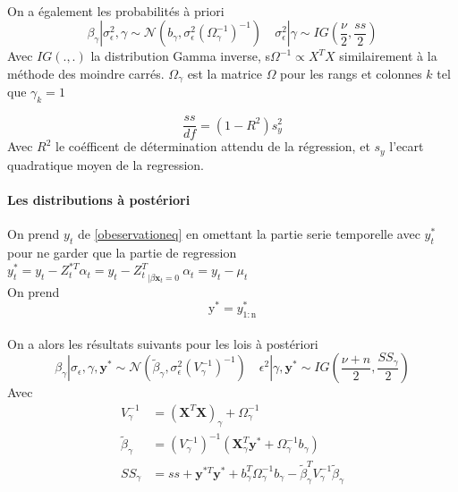 \documentclass{article}
\theoremstyle{definition}
\theoremstyle{remark}
\begin{document}
\paragraph{}
On a également les probabilités à priori
\[
	\beta_{\gamma}\left|\sigma_{\epsilon}^{2}, \gamma \sim \mathcal{N}\left(b_{\gamma},
	\sigma_{\epsilon}^{2}\left(\Omega_{\gamma}^{-1}\right)^{-1}\right) \quad \sigma_{\epsilon}^{2}\right| \gamma \sim IG\left(\frac{\nu}{2}, \frac{s s}{2}\right)
	\]
	Avec $IG(.,.)$ la distribution Gamma inverse, s$\Omega^{-1}\propto X^{T} X$ similairement à la méthode des moindre carrés. $\Omega_{\gamma}$ est la matrice $\Omega$
	pour les rangs et colonnes $k$ tel que $\gamma_k  = 1$  
	
	\begin{equation}
		\frac{s s}{d f}=\left(1-R^{2}\right) s_{y}^{2}
	\end{equation}
	Avec $R^2$ le coéfficent de détermination attendu de la régression, et $s_{y}$ l'ecart quadratique moyen de la regression.
	
\paragraph{Les distributions à postériori \\}
On prend $y_t$ de \ref{obeservationeq} en omettant la partie serie temporelle avec $y_{t}^{*}$ pour ne garder que la partie de regression\\ 
$y_{t}^{*}=y_{t}-Z_{t}^{* T} \alpha_{t} = y_{t}-{Z_{t}^{T}}_{ | \beta \mathbf{x}_t = 0} \ \alpha_{t} = y_t - \mu_t$ \\
On prend $$\mathrm{y}^{*}=y_{\mathrm{1:n}}^{*}$$

\paragraph{}
On a alors les résultats suivants pour les lois à postériori
\begin{equation}
	\beta_{\gamma}\left|\sigma_{\epsilon}, \gamma, \mathbf{y}^{*} \sim \mathcal{N}\left(\tilde{\beta}_{\gamma}, 
	\sigma_{\epsilon}^{2}\left(V_{\gamma}^{-1}\right)^{-1}\right) \quad 
	{\epsilon}^{2}\right| \gamma, \mathbf{y}^{*} \sim IG\left(\frac{\nu+n}{2}, \frac{S S_{\gamma}}{2}\right)
\end{equation}
Avec 
\begin{equation}
\begin{aligned}
V_{\gamma}^{-1} &=\left(\mathbf{X}^{T} \mathbf{X}\right)_{\gamma}+\Omega_{\gamma}^{-1} \\
 \tilde{\beta}_{\gamma} &=\left(V_{\gamma}^{-1}\right)^{-1}\left(\mathbf{X}_{\gamma}^{T} \mathbf{y}^{*}+\Omega_{\gamma}^{-1} b_{\gamma}\right) \\ 
SS_{\gamma}& =ss+\mathbf{y}^{* T} \mathbf{y}^{*}+b_{\gamma}^{T} \Omega_{\gamma}^{-1} b_{\gamma}-\tilde{\beta}_{\gamma}^{T} V_{\gamma}^{-1} \tilde{\beta}_{\gamma}
\end{aligned}
\end{equation}
\end{document}
